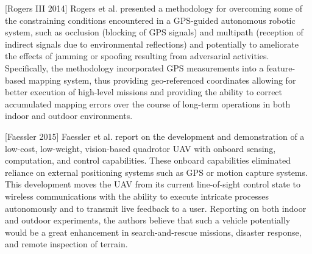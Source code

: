 [Rogers III 2014] Rogers et al. presented a methodology for overcoming some of the constraining conditions encountered in a GPS-guided autonomous robotic system, such as occlusion (blocking of GPS signals) and multipath (reception of indirect signals due to environmental reflections) and potentially to ameliorate the effects of jamming or spoofing resulting from adversarial activities. Specifically, the methodology incorporated GPS measurements into a feature-based mapping system, thus providing geo-referenced coordinates allowing for better execution of high-level missions and providing the ability to correct accumulated mapping errors over the course of long-term operations in both indoor and outdoor environments.

[Faessler 2015] Faessler et al. report on the development and demonstration of a low-cost, low-weight, vision-based quadrotor UAV with onboard sensing, computation, and control capabilities. These onboard capabilities eliminated reliance on external positioning systems such as GPS or motion capture systems. This development moves the UAV from its current line-of-sight control state to wireless communications with the ability to execute intricate processes autonomously and to transmit live feedback to a user. Reporting on both indoor and outdoor experiments, the authors believe that such a vehicle potentially would be a great enhancement in search-and-rescue missions, disaster response, and remote inspection of terrain. 
